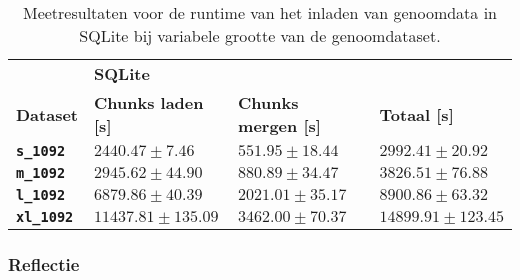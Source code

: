 \begin{table}[h]
\centering
\begin{tabular}{@{}llll@{}}
\cmidrule(l){2-4}
                              & \multicolumn{3}{|l|}{\textbf{SQLite}}                             \\ 
\cmidrule(l){1-4}
\multicolumn{1}{|l|}{\textbf{Dataset}}  & \multicolumn{1}{l|}{\textbf{Chunks laden [s]}} & \multicolumn{1}{l|}{\textbf{Chunks mergen [s]}} & \multicolumn{1}{l|}{\textbf{Totaal [s]}} \\ \midrule
\multicolumn{1}{|l|}{\textbf{\texttt{s\_1092}}} &    \multicolumn{1}{l|}{$2440.47 \pm 7.46$}         & \multicolumn{1}{l|}{$551.95 \pm 18.44$}          & \multicolumn{1}{l|}{$2992.41 \pm 20.92$}                          \\
\multicolumn{1}{|l|}{\textbf{\texttt{m\_1092}}} &    \multicolumn{1}{l|}{$2945.62 \pm 44.90$}       & \multicolumn{1}{l|}{$880.89 \pm 34.47$}          & \multicolumn{1}{l|}{$3826.51 \pm 76.88$}                          \\
\multicolumn{1}{|l|}{\textbf{\texttt{l\_1092}}} &    \multicolumn{1}{l|}{$6879.86 \pm 40.39$}       & \multicolumn{1}{l|}{$2021.01 \pm 35.17$}          & \multicolumn{1}{l|}{$8900.86 \pm 63.32$}                          \\
\multicolumn{1}{|l|}{\textbf{\texttt{xl\_1092}}} &    \multicolumn{1}{l|}{$11437.81 \pm 135.09$}       & \multicolumn{1}{l|}{$3462.00 \pm 70.37$}          & \multicolumn{1}{l|}{$14899.91 \pm 123.45$}                          \\
\bottomrule
\end{tabular}
\caption{Meetresultaten voor de runtime van het inladen van genoomdata in SQLite bij variabele grootte van de genoomdataset.}
\end{table}

\newpage
\subsubsection{Reflectie}


